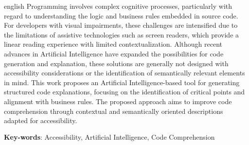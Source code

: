 \documentclass[
    12pt,                   %
    openright,              %
    oneside,                %
    a4paper,                %
    sumario=tradicional,    %
    english,                %
    brazil,                 %
    ]{abntex2}
\begin{document}
\begin{resumo}[Abstract]
\begin{otherlanguage*}{english}
  \noindent
  Programming involves complex cognitive processes, particularly with regard to understanding the logic and business rules embedded in source code. For developers with visual impairments, these challenges are intensified due to the limitations of assistive technologies such as screen readers, which provide a linear reading experience with limited contextualization. Although recent advances in Artificial Intelligence have expanded the possibilities for code generation and explanation, these solutions are generally not designed with accessibility considerations or the identification of semantically relevant elements in mind. This work proposes an Artificial Intelligence-based tool for generating structured code explanations, focusing on the identification of critical points and alignment with business rules. The proposed approach aims to improve code comprehension through contextual and semantically oriented descriptions adapted for accessibility.
  \vspace{\onelineskip}

  \noindent
  \textbf{Key-words}: Accessibility, Artificial Intelligence, Code Comprehension
 \end{otherlanguage*}
\end{resumo}

\listoffigures*
\cleardoublepage

\cleardoublepage




\end{document}
